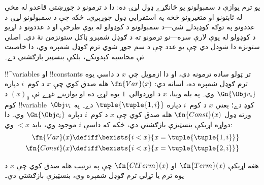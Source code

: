 \documentclass[../../../include/open-logic-section]{subfiles}
\begin{document}

\begin{explain}
يو ترم يوازې د سمبولونو يو ځانګړے ډول لړۍ ده: دا د ترمونو د جوړښتي
قاعدو له مخې له ثابتونو او متغيرونو څخه په استقرايي ډول جوړېږي۔ ځکه
چې د سمبولونو لړۍ د عددونو په توګه کوډېدلے شي---د سمبولونو د کوډولو
له يوې طرحې او د عددونو د لړيو د کوډولو له يوې لارې سره---نو ترمونو
ته د ګوډل شمېرو ټاکل ستونزمن نۀ دي۔ اصلي ستونزه دا ښودل دي چې يو عدد
چې د سم جوړ شوي ترم ګوډل شمېره وي، دا خاصيت ئې محاسبه کېدونکے، بلکې
بنسټيز بازګشتي دے۔
\end{explain}

!!^{variable}s او !!{constant}s تر ټولو ساده ترمونه دي، او دا ازمويل
چې $x$ د داسې يوه ترم ګوډل شمېره ده، اسانه دي: $\fn{Var}(x)$ هله
صدق کوي چې $x$ د کوم~$i$ دپاره $\Gn{\Obj v_i}$ وي۔ په بله وينا،
$x$ د اوږدوالي~$1$ يوه لړۍ ده او يوازينے غړے ئې $(x)_0$ د کوم
!!{variable}~$\Obj v_i$ کوډ دے؛ يعنې $x$ د کوم~$i$ دپاره
$\tuple{\tuple{1, i}}$ دے۔ په ورته ډول $\fn{Const}(x)$ هله صدق کوي
چې $x$ د کوم~$i$ دپاره $\Gn{\Obj c_i}$ وي۔ دا دواړه اړيکې بنسټيزې
بازګشتي دي، ځکه که داسې $i$ موجود وي، بايد $<x$ وي:
\begin{align*}
  \fn{Var}(x) & \defiff \bexists{i<x}{x = \tuple{\tuple{1, i}}}\\
  \fn{Const}(x) & \defiff \bexists{i<x}{x = \tuple{\tuple{2, i}}}
\end{align*}

\begin{prop}
هغه اړيکې $\fn{Term}(x)$ او $\fn{ClTerm}(x)$ چې په ترتيب هله صدق کوي
چې $x$ د يوه ترم يا تړلي ترم ګوډل شمېره وي، بنسټيزې بازګشتي دي۔
\end{prop}
\end{document}
